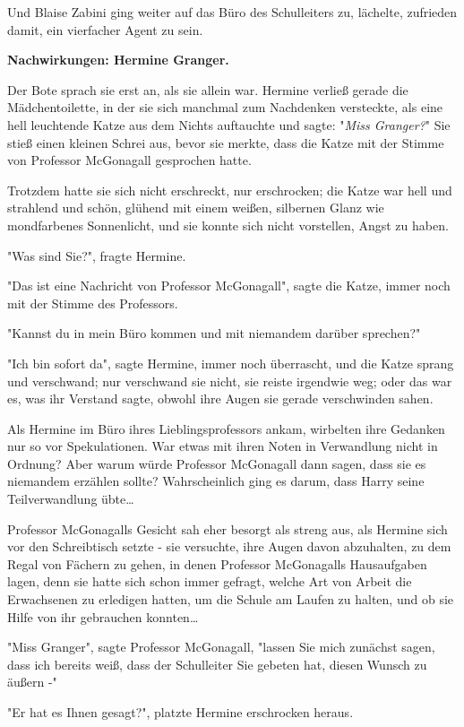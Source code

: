 {Und Blaise Zabini ging weiter auf das Büro des Schulleiters zu, lächelte, zufrieden damit, ein vierfacher Agent zu sein.

\textbf{Nachwirkungen: Hermine Granger.}

Der Bote sprach sie erst an, als sie allein war. Hermine verließ gerade die Mädchentoilette, in der sie sich manchmal zum Nachdenken versteckte, als eine hell leuchtende Katze aus dem Nichts auftauchte und sagte: "\emph{Miss Granger?}" Sie stieß einen kleinen Schrei aus, bevor sie merkte, dass die Katze mit der Stimme von Professor McGonagall gesprochen hatte.

Trotzdem hatte sie sich nicht erschreckt, nur erschrocken; die Katze war hell und strahlend und schön, glühend mit einem weißen, silbernen Glanz wie mondfarbenes Sonnenlicht, und sie konnte sich nicht vorstellen, Angst zu haben.

"Was sind Sie?", fragte Hermine.

"Das ist eine Nachricht von Professor McGonagall", sagte die Katze, immer noch mit der Stimme des Professors.

"Kannst du in mein Büro kommen und mit niemandem darüber sprechen?"

"Ich bin sofort da", sagte Hermine, immer noch überrascht, und die Katze sprang und verschwand; nur verschwand sie nicht, sie reiste irgendwie weg; oder das war es, was ihr Verstand sagte, obwohl ihre Augen sie gerade verschwinden sahen.

Als Hermine im Büro ihres Lieblingsprofessors ankam, wirbelten ihre Gedanken nur so vor Spekulationen. War etwas mit ihren Noten in Verwandlung nicht in Ordnung? Aber warum würde Professor McGonagall dann sagen, dass sie es niemandem erzählen sollte? Wahrscheinlich ging es darum, dass Harry seine Teilverwandlung übte…

Professor McGonagalls Gesicht sah eher besorgt als streng aus, als Hermine sich vor den Schreibtisch setzte - sie versuchte, ihre Augen davon abzuhalten, zu dem Regal von Fächern zu gehen, in denen Professor McGonagalls Hausaufgaben lagen, denn sie hatte sich schon immer gefragt, welche Art von Arbeit die Erwachsenen zu erledigen hatten, um die Schule am Laufen zu halten, und ob sie Hilfe von ihr gebrauchen konnten…

"Miss Granger", sagte Professor McGonagall, "lassen Sie mich zunächst sagen, dass ich bereits weiß, dass der Schulleiter Sie gebeten hat, diesen Wunsch zu äußern -"

"Er hat es Ihnen gesagt?", platzte Hermine erschrocken heraus.

}
